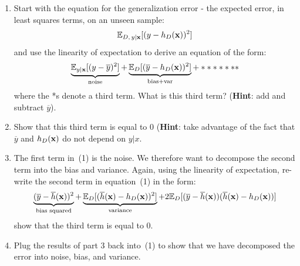 \documentclass[12pt,letterpaper]{article}
\begin{document}
\begin{enumerate}
    \item Start with the equation for the generalization error - the expected error, in least squares terms, on an unseen sample:
    \begin{align}
        \mathbb{E}_{D, \, y|\mathbf{x}}[(y-h_D(\mathbf{x}))^2]\notag
    \end{align}
    and use the linearity of expectation to derive an equation of the form:
    \begin{align}
        \underbrace{\mathbb{E}_{y|\mathbf{x}}[(y-\overline{y})^2]}_\text{noise}
+\underbrace{\mathbb{E}_D[(\overline{y}-h_D(\mathbf{x}))^2]}_\text{bias+var}
+ *******
    \end{align}{}
    where the *s denote a third term. What is this third term? (\textbf{Hint}: add and subtract $\overline{y}$).
    \item
    Show that this third term is equal to 0 (\textbf{Hint}: take advantage of the fact that $\overline{y}$ and $h_D(\mathbf{x})$ do not depend on $y|x$.
    \item
    The first term in~(1) is the noise. We therefore want to decompose the second term into the bias and variance. Again, using the linearity of expectation, re-write the second term in equation~(1) in the form:
    \begin{align}
        \underbrace{(\overline{y}-\overline{h}(\mathbf{x}))^2}_\text{bias squared}+\underbrace{\mathbb{E}_D[(\overline{h}(\mathbf{x})-h_D(\mathbf{x}))^2]}_\text{variance}
+2\mathbb{E}_D[(\overline{y}-\overline{h}(\mathbf{x}))(\overline{h}(\mathbf{x})-h_D(\mathbf{x}))]
    \end{align}
    show that the third term is equal to 0.
    \item
    Plug the results of part 3 back into~(1) to show that we have decomposed the error into noise, bias, and variance.

\newpage

\end{enumerate}
\end{document}
